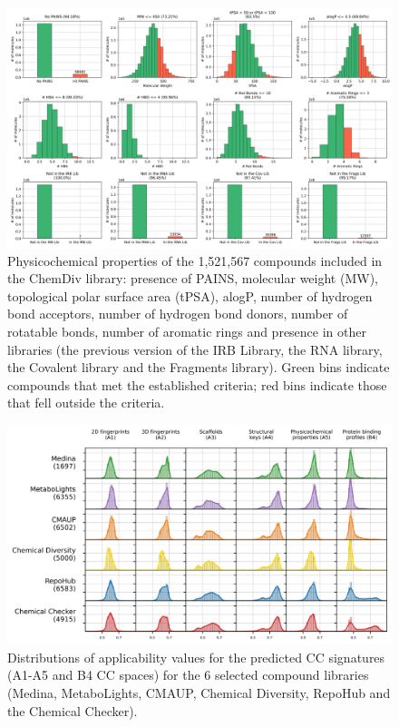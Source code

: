 \begin{figure}[ht]
  \centering
  \includegraphics[width=1\linewidth]{figures/Navigation/Supplementary/filter.png}
  \caption{Physicochemical properties of the 1,521,567 compounds included in the ChemDiv library: presence of PAINS, molecular weight (MW), topological polar surface area (tPSA), alogP, number of hydrogen bond acceptors, number of hydrogen bond donors, number of rotatable bonds, number of aromatic rings and presence in other libraries (the previous version of the IRB Library, the RNA library, the Covalent library and the Fragments library). Green bins indicate compounds that met the established criteria; red bins indicate those that fell outside the criteria.
  }
  \label{Navigation_FigS2}
\end{figure}


\begin{figure}[ht]
  \centering
  \includegraphics[width=1\linewidth]{figures/Navigation/Supplementary/applicability.png}
  \caption{Distributions of applicability values for the predicted CC signatures (A1-A5 and B4 CC spaces) for the 6 selected compound libraries (Medina, MetaboLights, CMAUP, Chemical Diversity, RepoHub and the Chemical Checker).
  }
  \label{Navigation_FigS3}
\end{figure}

